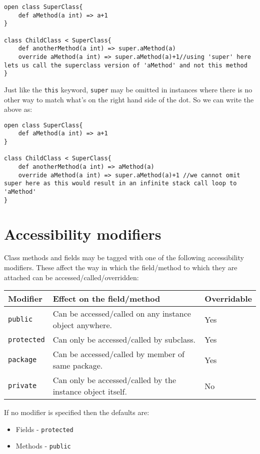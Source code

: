 \documentclass[conc-doc]{subfiles}
\begin{document}
\begin{lstlisting}
open class SuperClass{
	def aMethod(a int) => a+1
}

class ChildClass < SuperClass{
	def anotherMethod(a int) => super.aMethod(a)
	override aMethod(a int) => super.aMethod(a)+1//using 'super' here lets us call the superclass version of 'aMethod' and not this method
}
\end{lstlisting}

Just like the \lstinline{this} keyword, \lstinline{super} may be omitted in instances where there is no other way to match what's on the right hand side of the dot. So we can write the above as:

\begin{lstlisting}
open class SuperClass{
	def aMethod(a int) => a+1
}

class ChildClass < SuperClass{
	def anotherMethod(a int) => aMethod(a)
	override aMethod(a int) => super.aMethod(a)+1 //we cannot omit super here as this would result in an infinite stack call loop to 'aMethod'
}
\end{lstlisting}

\section{Accessibility modifiers}
Class methods and fields may be tagged with one of the following accessibility modifiers. These affect the way in which the field/method to which they are attached can be accessed/called/overridden:


\begin{table}[H]
	\centering
	\begin{tabular}{lll}
		\hline
		Modifier&Effect on the field/method&Overridable\\
		\hline
		\lstinline!public!&Can be accessed/called on any instance object anywhere.&Yes\\
		\lstinline!protected!&Can only be accessed/called by subclass.&Yes\\
		\lstinline!package!&Can be accessed/called by member of same package.&Yes\\
		\lstinline!private!&Can only be accessed/called by the instance object itself.&No\\
		\hline
	\end{tabular}%
\end{table}

If no modifier is specified then the defaults are:
\begin{itemize}
	\item Fields - \lstinline!protected!
	\item Methods - \lstinline!public!
\end{itemize}
\end{document}
